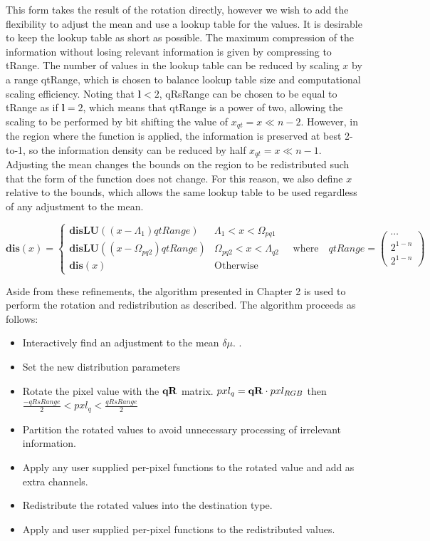   This form takes the result of the rotation directly, however we wish to add the flexibility to adjust the mean and use a lookup table for the values. It is desirable to keep the lookup table as short as possible. The maximum compression of the information without losing relevant information is given by compressing to tRange. The number of values in the lookup table can be reduced by scaling $x$ by a range qtRange, which is chosen to balance lookup table size and computational scaling efficiency.  Noting that $\mathbf{l} <2$, qRsRange can be chosen to be equal to tRange as if $\mathbf{l} =2$, which means that qtRange is a power of two, allowing the scaling to be performed by bit shifting the value of $x_{qt} = x \ll n-2$. However, in the region where the function is applied, the information is preserved at best 2-to-1, so the information density can be reduced by half $x_{qt} = x \ll n-1$. Adjusting the mean changes the bounds on the region to be redistributed such that the form of the function does not change. For this reason, we also define $x$ relative to the bounds, which allows the same lookup table to be used regardless of any adjustment to the mean.
  
    \begin{equation}
  \textbf{dis}(x) =  \begin{cases}
    \textbf{disLU}((x-\Lambda_{1}) qtRange)  & \Lambda_{1} < x < \Omega_{pq1} \\
  \textbf{disLU}((x-\Omega_{pq2}) qtRange)  & \Omega_{pq2} < x < \Lambda_{q2} \\
  \textbf{dis}(x)  & \text{Otherwise}
    \end{cases} \quad \text{where} \quad 
    qtRange = \left(\begin{smallmatrix}
    \cdots \\ 2^{1-n}\\2^{1-n}
    \end{smallmatrix}\right)
    \end{equation}
  
  Aside from these refinements, the algorithm presented in Chapter 2 is used to perform the rotation and redistribution as described. The algorithm proceeds as follows:
  
  \begin{itemize}
  \item Interactively find an adjustment to the mean  $\delta\mu$. .
  \item Set the new distribution parameters
  \item Rotate the pixel value with the $\qR$ matrix. $ pxl_{q} = \qR \cdot pxl_{RGB}$ then $ \frac{- qRsRange}{2} < pxl_{q} < \frac{ qRsRange}{2}$
  \item Partition the rotated values to avoid unnecessary processing of irrelevant information.
  \item Apply any user supplied per-pixel functions to the rotated value and add as extra channels.
  \item Redistribute the rotated values into the destination type.
  \item Apply and user supplied per-pixel functions to the redistributed values.
  \end{itemize}


